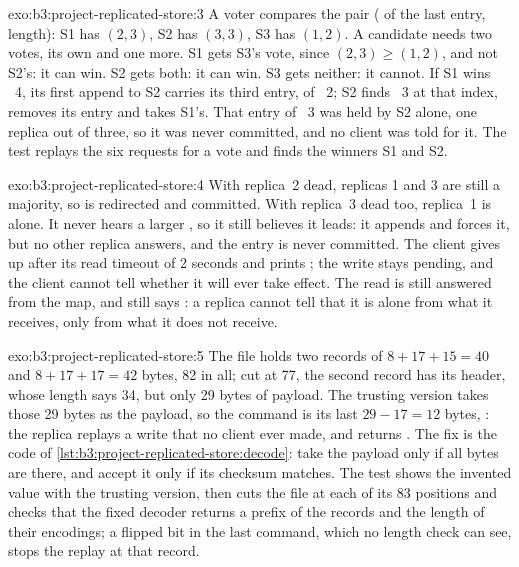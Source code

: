 \begin{solution}{exo:b3:project-replicated-store:3}
A voter compares the pair ( of the last entry, length): S1 has $(2, 3)$, S2 has $(3, 3)$, S3 has $(1, 2)$. A candidate needs two votes, its own and one more. S1 gets S3's vote, since $(2, 3) \geq (1, 2)$, and not S2's: it can win. S2 gets both: it can win. S3 gets neither: it cannot. If S1 wins ~4, its first append to S2 carries its third entry, of ~2; S2 finds ~3 at that index, removes its entry and takes S1's. That entry of ~3 was held by S2 alone, one replica out of three, so it was never committed, and no client was told  for it. The test  replays the six requests for a vote and finds the winners S1 and S2.
\end{solution}

\begin{solution}{exo:b3:project-replicated-store:4}
\label{out:b3:project-replicated-store:ex4}
With replica~2 dead, replicas 1 and 3 are still a majority, so  is redirected and committed. With replica~3 dead too, replica~1 is alone. It never hears a larger , so it still believes it leads: it appends  and forces it, but no other replica answers, and the entry is never committed. The client gives up after its read timeout of 2 seconds and prints ; the write stays pending, and the client cannot tell whether it will ever take effect. The read is still answered from the map, and  still says : a replica cannot tell that it is alone from what it receives, only from what it does not receive.
\end{solution}

\begin{solution}{exo:b3:project-replicated-store:5}
The file holds two records of $8 + 17 + 15 = 40$ and $8 + 17 + 17 = 42$ bytes, 82 in all; cut at 77, the second record has its header, whose length says 34, but only 29 bytes of payload. The trusting version takes those 29 bytes as the payload, so the command is its last $29 - 17 = 12$ bytes, : the replica replays a write that no client ever made, and  returns . The fix is the code of \cref{lst:b3:project-replicated-store:decode}: take the payload only if all  bytes are there, and accept it only if its checksum matches. The test  shows the invented value with the trusting version, then cuts the file at each of its 83 positions and checks that the fixed decoder returns a prefix of the records and the length of their encodings; a flipped bit in the last command, which no length check can see, stops the replay at that record.
\end{solution}

